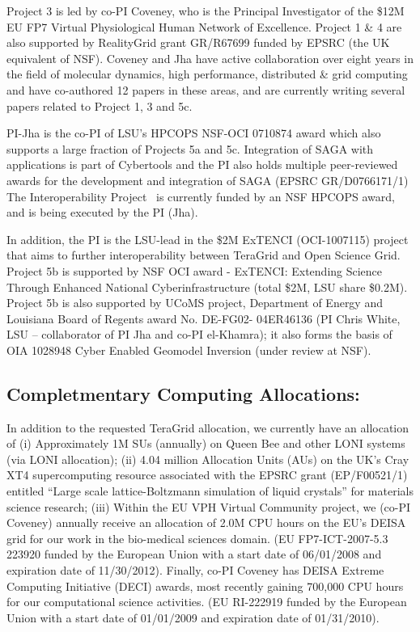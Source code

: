 \documentclass[a4paper,10pt]{article}
\newcommand{\up}{\vspace*{-1em}}
\begin{document}
Project 3 is led by co-PI Coveney, who is the Principal Investigator of the \$12M EU FP7 Virtual Physiological Human Network of Excellence. Project 1 \& 4 are also supported by RealityGrid grant GR/R67699 funded by EPSRC (the UK equivalent of NSF). Coveney and Jha have active collaboration over eight years in the field of molecular dynamics, high performance, distributed \& grid computing and have co-authored 12 papers in these areas, and are currently writing several papers related to Project 1, 3 and 5c.
 
PI-Jha is the co-PI of LSU's HPCOPS NSF-OCI 0710874 award which also
supports a large fraction of Projects 5a and 5c. Integration of SAGA
with applications is part of Cybertools and the PI also holds multiple
peer-reviewed awards for the development and integration of SAGA
(EPSRC GR/D0766171/1) The Interoperability Project~\cite{interop_url}
is currently funded by an NSF HPCOPS award, and is being executed by
the PI (Jha).


In addition, the PI is the LSU-lead in the \$2M ExTENCI (OCI-1007115) project that aims to further interoperability between TeraGrid and Open Science Grid.  Project 5b is supported by NSF OCI award - ExTENCI: Extending Science Through Enhanced National Cyberinfrastructure (total \$2M, LSU share \$0.2M). Project 5b is also supported by UCoMS project, Department of Energy and Louisiana Board of Regents award No. DE-FG02- 04ER46136 (PI Chris White, LSU -- collaborator of PI Jha and co-PI el-Khamra); it also forms the basis of OIA 1028948 Cyber Enabled Geomodel Inversion (under review at NSF).

\up
\subsection{Completmentary Computing Allocations:}
\up
 In addition to the requested TeraGrid allocation, we currently have an allocation of (i) Approximately 1M SUs (annually) on Queen Bee and other LONI systems (via LONI allocation); (ii) 4.04 million Allocation Units (AUs) on the UK's Cray XT4 supercomputing resource associated with the EPSRC grant (EP/F00521/1) entitled ``Large scale lattice-Boltzmann simulation of liquid crystals'' for materials science research; (iii) Within the EU VPH Virtual Community project, we (co-PI Coveney) annually receive an allocation of 2.0M CPU hours on the EU's DEISA grid for our work in the bio-medical sciences domain.  (EU FP7-ICT-2007-5.3 223920 funded by the European Union with a start date of 06/01/2008 and expiration date of 11/30/2012). Finally, co-PI Coveney has DEISA Extreme Computing Initiative (DECI) awards, most recently gaining 700,000 CPU hours for our computational science activities.  (EU RI-222919 funded by the European Union with a start date of 01/01/2009 and expiration date of 01/31/2010).
\end{document}
